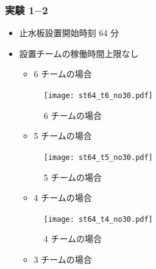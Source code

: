 \documentclass[a4paper,12pt,fleqn]{jarticle}
\begin{document}
\subsubsection{実験 1$-$2}
\begin{itemize}
\item 止水板設置開始時刻 64 分
\item 設置チームの稼働時間上限なし


\begin{itemize}
\item 6 チームの場合
\end{itemize}

\begin{figure}[H]
\begin{center}
  \texttt{[image: st64\_t6\_no30.pdf]}
  \caption{6 チームの場合}
  \label{fig:st64_t6_no30}
  \end{center}
\end{figure}

\begin{itemize}
\item 5 チームの場合
\end{itemize}

\begin{figure}[H]
\begin{center}
  \texttt{[image: st64\_t5\_no30.pdf]}
  \caption{5 チームの場合}
  \label{fig:st64_t5_no30}
  \end{center}
\end{figure}

\begin{itemize}
\item 4 チームの場合
\end{itemize}

\begin{figure}[H]
\begin{center}
  \texttt{[image: st64\_t4\_no30.pdf]}
  \caption{4 チームの場合}
  \label{fig:st64_t4_no30}
  \end{center}
\end{figure}

\begin{itemize}
\item 3 チームの場合
\end{itemize}


\end{itemize}
\end{document}
